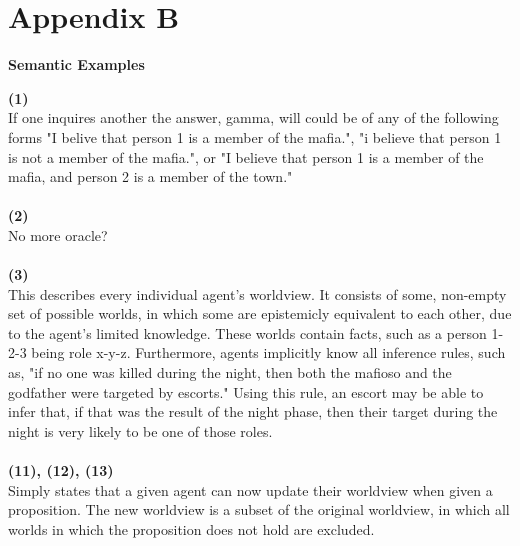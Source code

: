 \section*{Appendix B}\label{app:B}
\begin{center}
	\textbf{Semantic Examples}
\end{center}
\textbf{(1)} \\
If one inquires another the answer, gamma, will could be of any of the 
following forms "I belive that person 1 is a member of the mafia.", "i believe 
that person 1 is not a member of the mafia.", or "I believe that person 1 is a 
member of the mafia, and person 2 is a member of the town."  \\ \\
\textbf{(2)} \\
No more oracle? \\ \\
\textbf{(3)} \\
This describes every individual agent's worldview. It consists of some, 
non-empty set of possible worlds, in which some are epistemicly equivalent to 
each other, due to the agent's limited knowledge. These worlds contain facts, 
such as a person 1-2-3 being role x-y-z. Furthermore, agents implicitly know 
all inference rules, such as, "if no one was killed during the night, then both 
the mafioso and the godfather were targeted by escorts." Using this rule, an 
escort may be able to infer that, if that was the result of the night phase, 
then their target during the night is very likely to be one of those roles.  \\ 
\\
\textbf{(11), (12), (13)} \\
Simply states that a given agent can now update their worldview when given a 
proposition. The new worldview is a subset of the original worldview, in which 
all worlds in which the proposition does not hold are excluded. 
